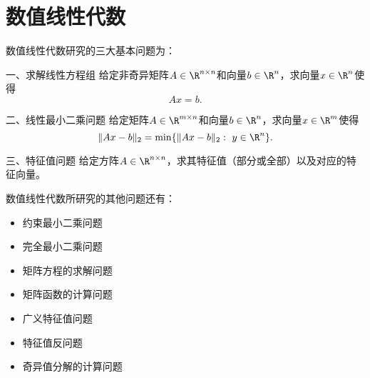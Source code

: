 \section{数值线性代数}

\begin{frame}\ft{\secname}%
\begin{small}

数值线性代数研究的三大基本问题为：\vspace{0.1in}

\begin{block}{一、求解线性方程组}
给定非奇异矩阵$A\in\R^{n\times n}$和向量$b\in\R^n$，求向量$x\in\R^n$使得
$$
Ax = b.
$$
\end{block}
\end{small}
\end{frame}

\begin{frame}\ft{\secname}
\begin{small}
\begin{block}{二、线性最小二乘问题}
给定矩阵$A\in\R^{m\times n}$和向量$b\in\R^n$，求向量$x\in\R^m$使得
$$
\|Ax - b\|_2 = \min \{\|Ax - b\|_2:~ y \in \R^n \}.
$$
\end{block}
\end{small}
\end{frame}

\begin{frame}\ft{\secname} 
\begin{small}
\begin{block}{三、特征值问题}
给定方阵$A\in\R^{n\times n}$，求其特征值（部分或全部）以及对应的特征向量。
\end{block}
\end{small}
\end{frame}


\begin{frame}\ft{\secname}%
\begin{small}
数值线性代数所研究的其他问题还有：
\begin{itemize}
\item
约束最小二乘问题
\item
完全最小二乘问题
\item
矩阵方程的求解问题
\item
矩阵函数的计算问题
\item
广义特征值问题
\item
特征值反问题
\item
\colorbox{fcolor5}{奇异值分解的计算问题}
\end{itemize}
\end{small}
\end{frame}
